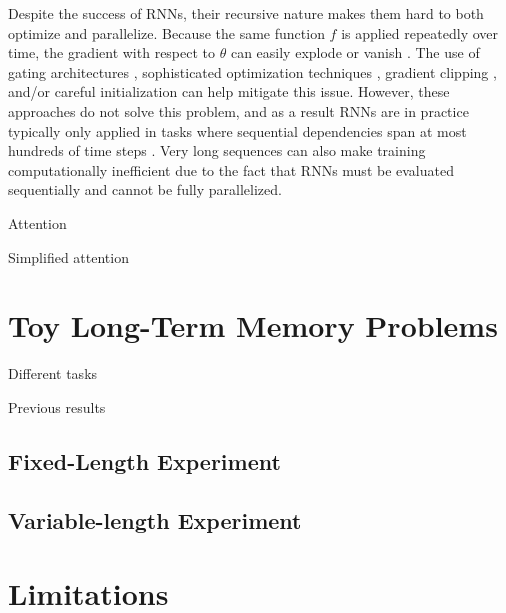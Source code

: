 \documentclass{article} %
\begin{document}
Despite the success of RNNs, their recursive nature makes them hard to both optimize and parallelize.
Because the same function $f$ is applied repeatedly over time, the gradient with respect to $\theta$ can easily explode or vanish \cite{}.
The use of gating architectures \cite{}, sophisticated optimization techniques \cite{}, gradient clipping \cite{}, and/or careful initialization \cite{} can help mitigate this issue.
However, these approaches do not solve this problem, and as a result RNNs are in practice typically only applied in tasks where sequential dependencies span at most hundreds of time steps \cite{}.
Very long sequences can also make training computationally inefficient due to the fact that RNNs must be evaluated sequentially and cannot be fully parallelized.

Attention

Simplified attention

\section{Toy Long-Term Memory Problems}

Different tasks

Previous results

\subsection{Fixed-Length Experiment}

\subsection{Variable-length Experiment}

\section{Limitations}
\end{document}
